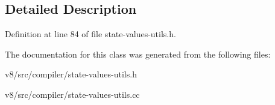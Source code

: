 \subsection{Detailed Description}


Definition at line 84 of file state-\/values-\/utils.\+h.



The documentation for this class was generated from the following files\+:\begin{DoxyCompactItemize}
\item 
v8/src/compiler/state-\/values-\/utils.\+h\item 
v8/src/compiler/state-\/values-\/utils.\+cc\end{DoxyCompactItemize}
